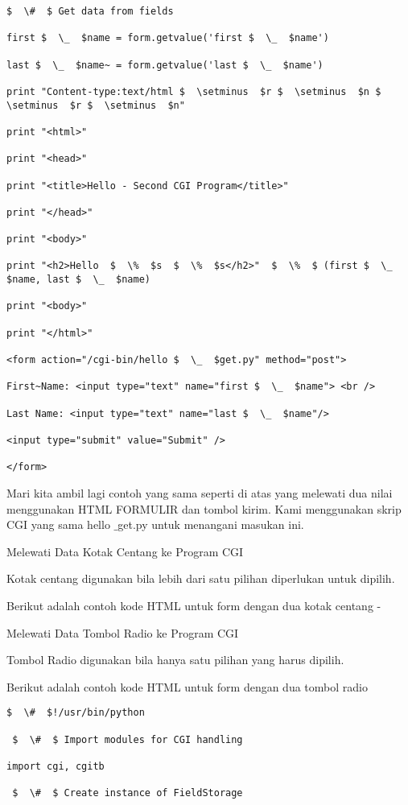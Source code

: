 \begin {enumerate}
\begin {enumerate}
\begin{verbatim}
$  \#  $ Get data from fields

first $  \_  $name = form.getvalue('first $  \_  $name')

last $  \_  $name~ = form.getvalue('last $  \_  $name')

print "Content-type:text/html $  \setminus  $r $  \setminus  $n $  \setminus  $r $  \setminus  $n"

print "<html>"

print "<head>"

print "<title>Hello - Second CGI Program</title>"

print "</head>"

print "<body>"

print "<h2>Hello  $  \%  $s  $  \%  $s</h2>"  $  \%  $ (first $  \_  $name, last $  \_  $name)

print "<body>"

print "</html>"

<form action="/cgi-bin/hello $  \_  $get.py" method="post">

First~Name: <input type="text" name="first $  \_  $name"> <br />

Last Name: <input type="text" name="last $  \_  $name"/>

<input type="submit" value="Submit" />

</form>

\end{verbatim}
Mari kita ambil lagi contoh yang sama seperti di atas yang melewati dua nilai menggunakan HTML FORMULIR dan tombol kirim. Kami menggunakan skrip CGI yang sama hello $  \_  $get.py untuk menangani masukan ini.

Melewati Data Kotak Centang ke Program CGI

Kotak centang digunakan bila lebih dari satu pilihan diperlukan untuk dipilih.

Berikut adalah contoh kode HTML untuk form dengan dua kotak centang -

Melewati Data Tombol Radio ke Program CGI

Tombol Radio digunakan bila hanya satu pilihan yang harus dipilih.

Berikut adalah contoh kode HTML untuk form dengan dua tombol radio
\begin{verbatim}
$  \#  $!/usr/bin/python

 $  \#  $ Import modules for CGI handling

import cgi, cgitb

 $  \#  $ Create instance of FieldStorage


\end{verbatim}
\end{enumerate}
\end{enumerate}
